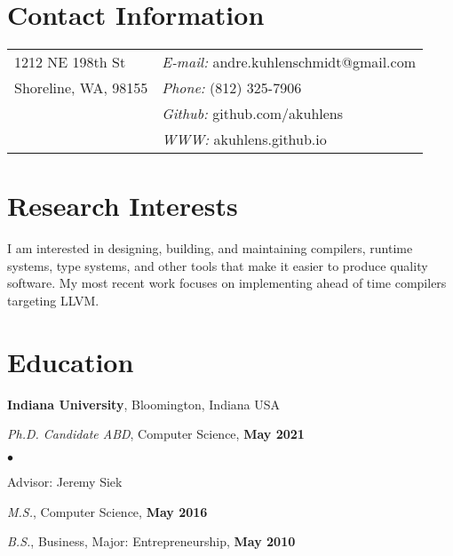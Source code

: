 \documentclass[resmargin,line]{res}
\newenvironment{list1}{
  \begin{list}{\ding{113}}{%
      \setlength{\itemsep}{0in}
      \setlength{\parsep}{0in} \setlength{\parskip}{0in}
      \setlength{\topsep}{0in} \setlength{\partopsep}{0in} 
      \setlength{\leftmargin}{0.17in}}}{\end{list}}
\newenvironment{list2}{
  \begin{list}{$\bullet$}{%
      \setlength{\itemsep}{0in}
      \setlength{\parsep}{0in} \setlength{\parskip}{0in}
      \setlength{\topsep}{0in} \setlength{\partopsep}{0in} 
      \setlength{\leftmargin}{0.2in}}}{\end{list}}
\begin{document}

\begin{resume}
\section{\sc Contact Information}
\vspace{.05in}
\begin{tabular}{@{}p{2in}p{4in}}
1212 NE 198th St      & {\it E-mail:} andre.kuhlenschmidt@gmail.com \\
Shoreline, WA, 98155  & {\it Phone:}  (812) 325-7906 \\
                      & {\it Github:} github.com/akuhlens  \\       
                      & {\it WWW:} akuhlens.github.io \\     
\end{tabular}

\section{\sc Research Interests}
I am interested in designing, building, and maintaining compilers,
runtime systems, type systems, and other tools that make it easier
to produce quality software. My most recent work focuses on
implementing ahead of time compilers targeting LLVM.

\section{\sc Education}
{\bf Indiana University},
Bloomington, Indiana USA\\
\vspace*{-.15in}
\begin{list1}
\item[] {\em Ph.D. Candidate ABD}, Computer Science, \hfill {\bf May 2021}\\
  \vspace*{-.15in}
  \begin{list2}
  \item[] Advisor:  Jeremy Siek
  \end{list2}
\item[] {\em M.S.}, Computer Science,  \hfill {\bf May 2016}
\item[] {\em B.S.}, Business, Major: Entrepreneurship, \hfill{} {\bf May 2010}
\end{list1}



\end{resume}
\end{document}
